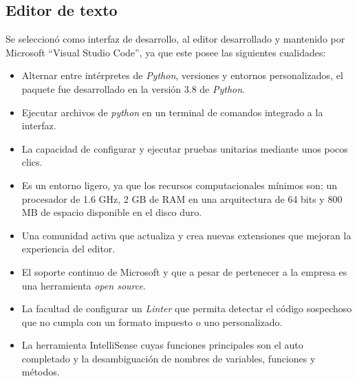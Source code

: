 \subsection{Editor de texto}
Se seleccionó como interfaz de desarrollo, al editor desarrollado y mantenido por Microsoft ``Visual Studio Code'', ya que este posee las siguientes cualidades:
\begin{itemize}
    \item Alternar entre intérpretes de \textit{Python}, versiones y entornos personalizados, el paquete fue desarrollado en la versión 3.8 de \textit{Python}.
    \item Ejecutar archivos de \textit{python} en un terminal de comandos integrado a la interfaz.
    \item La capacidad de configurar y ejecutar pruebas unitarias mediante unos pocos clics.
    \item Es un entorno ligero, ya que los recursos computacionales mínimos son: un procesador de 1.6 GHz, 2 GB de RAM en una arquitectura de 64 bits y 800 MB de espacio disponible en el disco duro.
    \item Una comunidad activa que actualiza y crea nuevas extensiones que mejoran la experiencia del editor.
    \item El soporte continuo de Microsoft y que a pesar de pertenecer a la empresa es una herramienta \textit{open source}.
    \item La facultad de configurar un \textit{Linter} que permita detectar el código sospechoso que no cumpla con un formato impuesto o uno personalizado. 
    \item La herramienta IntelliSense cuyas funciones principales son el auto completado y la desambiguación de nombres de variables, funciones y métodos.
\end{itemize}
